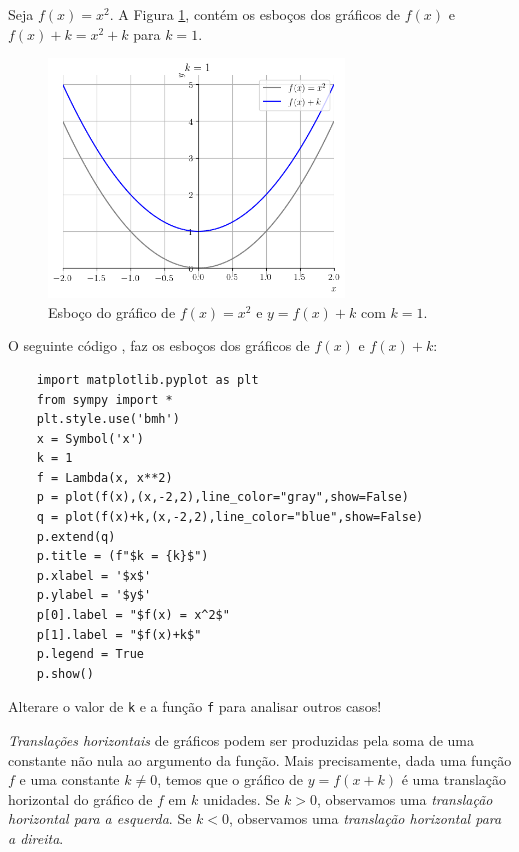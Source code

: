 \begin{ex}
  Seja $f(x) = x^2$. A Figura \ref{fig:ex_trans_vert}, contém os esboços dos gráficos de $f(x)$ e $f(x)+k = x^2+k$ para $k=1$.

  \begin{figure}[H]
    \centering
    \includegraphics[width=0.7\textwidth]{./cap_funcao/dados/fig_ex_transvert/fig_ex_transvert}
    \caption{Esboço do gráfico de $f(x) = x^2$ e $y=f(x)+k$ com $k=1$.}
    \label{fig:ex_trans_vert}
  \end{figure}

  \ifispython
  O seguinte código {\python}, faz os esboços dos gráficos de $f(x)$ e $f(x)+k$:
  \begin{lstlisting}
    import matplotlib.pyplot as plt
    from sympy import *
    plt.style.use('bmh')
    x = Symbol('x')
    k = 1
    f = Lambda(x, x**2)
    p = plot(f(x),(x,-2,2),line_color="gray",show=False)
    q = plot(f(x)+k,(x,-2,2),line_color="blue",show=False)
    p.extend(q)
    p.title = (f"$k = {k}$")
    p.xlabel = '$x$'
    p.ylabel = '$y$'
    p[0].label = "$f(x) = x^2$"
    p[1].label = "$f(x)+k$"
    p.legend = True
    p.show()
  \end{lstlisting}
  Alterare o valor de \verb+k+ e a função \verb+f+ para analisar outros casos!
  \fi
\end{ex}

\emph{Translações horizontais} de gráficos podem ser produzidas pela soma de uma constante não nula ao argumento da função. Mais precisamente, dada uma função $f$ e uma constante $k\neq 0$, temos que o gráfico de $y=f(x+k)$ é uma translação horizontal do gráfico de $f$ em $k$ unidades. Se $k>0$, observamos uma \emph{translação horizontal para a esquerda}. Se $k<0$, observamos uma \emph{translação horizontal para a direita}.

